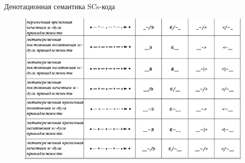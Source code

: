 \begin{frame}{\\Денотационная семантика SCs-кода}
	\topline
	\justifying
	\vspace*{\fill}\\
	\begin{SCn}
		\begin{figure}[H]
			\includegraphics[scale=0.5]{./figures/external_langs/table_scs_3.png}
		\end{figure}
	\end{SCn}
\end{frame}


